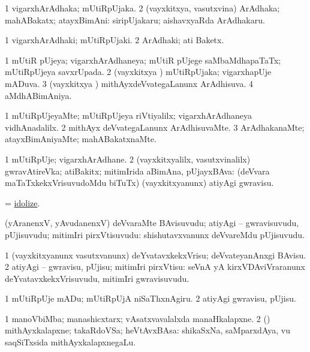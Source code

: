 \bentry
{}
\gl{\nA}
\bmng
\bnum
\num{1} vigarxhArAdhaka; mUtiRpUjaka. 
\num{2} (vayxkitxya, vasutxvina) ArAdhaka; mahABakatx; atayxBimAni:  siripUjakaru; aishavxyaRda ArAdhakaru. 
\enum
\emng
\eentry

\bentry
{}
\gl{\nA}
\bmng
\bnum
\num{1} vigarxhArAdhaki; mUtiRpUjaki. 
\num{2} ArAdhaki; ati Baketx. 
\enum
\emng
\eentry

\bentry
{}
\gl{\gu}
\bmng
\bnum
\num{1} mUtiR pUjeya; vigarxhArAdhaneya; mUtiR pUjege saMbaMdhapaTaTx; mUtiRpUjeya savxrUpada. 
\num{2} (vayxkitxya \vi) mUtiRpUjaka; vigarxhapUje mADuva. 
\num{3} (vayxkitxya \vi) mithAyxdeVvategaLanunx ArAdhisuva. 
\num{4} aMdhABimAniya. 
\enum
\emng
\eentry

\bentry
{}
\gl{\kirxvi}
\bmng
\bnum
\num{1} mUtiRpUjeyaMte; mUtiRpUjeya riVtiyalilx; vigarxhArAdhaneya vidhAnadalilx. 
\num{2} mithAyx deVvategaLanunx ArAdhisuvaMte. 
\num{3} ArAdhakanaMte; atayxBimAniyaMte; mahABakatxnaMte. 
\enum
\emng
\eentry

\bentry
{}
\gl{\nA}
\bmng
\bnum
\num{1} mUtiRpUje; vigarxhArAdhane. 
\num{2} (vayxkitxyalilx, vasutxvinalilx) gwravAtireVka; atiBakitx; mitimIrida aBimAna, pUjayxBAva:  (deVvara maTaTxkekxVrisuvudoMdu biTuTx) (vayxkitxyanunx) atiyAgi gwravisu. 
\enum
\emng
\eentry

\bentry
{}
\gl{\kirx}
\bmng
 = \hyperlink{idolize}{idolize}. 
\emng
\eentry

\bentry
{}
\gl{\nA}
\bmng
(yAranenxV, yAvudanenxV) deVvaraMte BAvisuvudu; atiyAgi -- gwravisuvudu, pUjisuvudu; mitimIri pirxVtisuvudu:  shishutavxvanunx deVvareMdu pUjisuvudu. 
\emng
\eentry

\bentry
{}
\gl{\sakirx}
\bmng
\bnum
\num{1} (vayxkitxyanunx vasutxvanunx) deYvatavxkekxVrisu; deVvateyanAnxgi BAvisu. 
\num{2} atiyAgi -- gwravisu, pUjisu; mitimIri pirxVtisu:  seVnA yA kirxVDAviVraranunx deYvatavxkekxVrisuvudu, mitimIri gwravisuvudu. 
\enum
\emng

\noindent
\gl{\akirx}
\bmng
\bnum
\num{1} mUtiRpUje mADu; mUtiRpUjA niSaThxnAgiru. 
\num{2} atiyAgi gwravisu, pUjisu. 
\enum
\emng
\eentry

\bentry
{}
\gl{\nA}
\bmng
\bnum
\num{1} manoVbiMba; manashicxtarx; vAsatxvavalalxda manaHkalapxne. 
\num{2} (\takaR) mithAyxkalapxne; takaRdoVSa; heVtAvxBAsa:  shikaSxNa, saMparxdAya, \mo vu saqSiTxsida mithAyxkalapxnegaLu. 
\enum
\emng
\eentry

